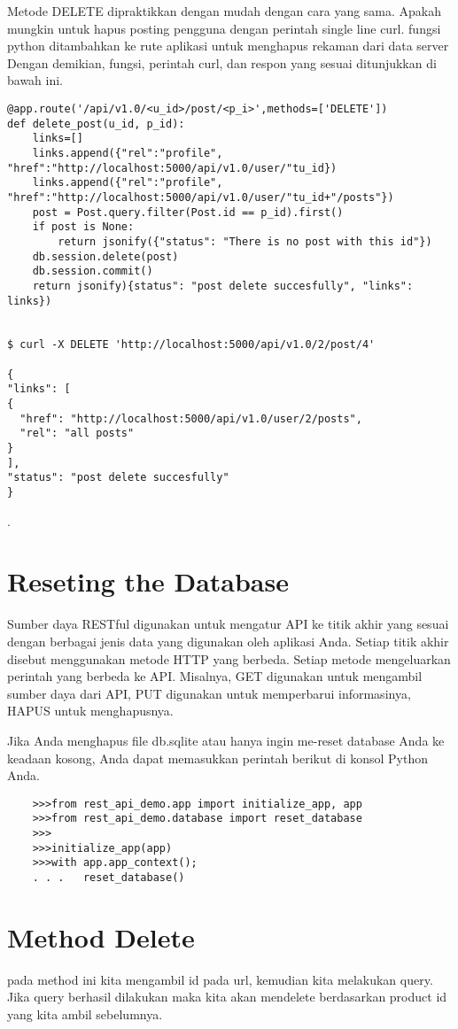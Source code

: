Metode DELETE dipraktikkan dengan mudah dengan cara yang sama. Apakah mungkin untuk hapus posting pengguna dengan perintah single line curl. 
fungsi python ditambahkan ke rute aplikasi untuk menghapus rekaman dari data server Dengan demikian, fungsi,  perintah curl, dan respon yang sesuai ditunjukkan di bawah ini.
\begin{verbatim}
@app.route('/api/v1.0/<u_id>/post/<p_i>',methods=['DELETE'])
def delete_post(u_id, p_id):
	links=[]
	links.append({"rel":"profile", "href":"http://localhost:5000/api/v1.0/user/"tu_id})
	links.append({"rel":"profile", "href":"http://localhost:5000/api/v1.0/user/"tu_id+"/posts"})
	post = Post.query.filter(Post.id == p_id).first()
	if post is None:
		return jsonify({"status": "There is no post with this id"})
	db.session.delete(post)
	db.session.commit()
	return jsonify){status": "post delete succesfully", "links": links})


$ curl -X DELETE 'http://localhost:5000/api/v1.0/2/post/4'

{
"links": [
{
  "href": "http://localhost:5000/api/v1.0/user/2/posts",
  "rel": "all posts"
}
],
"status": "post delete succesfully"
}
\end{verbatim}
\cite{alemu2014rest}.

\section{Reseting the Database}
Sumber daya RESTful digunakan untuk mengatur API ke titik akhir yang sesuai dengan berbagai jenis data yang digunakan oleh aplikasi Anda. Setiap titik akhir disebut menggunakan metode HTTP yang berbeda. Setiap metode mengeluarkan perintah yang berbeda ke API. Misalnya, GET digunakan untuk mengambil sumber daya dari API, PUT digunakan untuk memperbarui informasinya, HAPUS untuk menghapusnya.

Jika Anda menghapus file db.sqlite atau hanya ingin me-reset database Anda ke keadaan kosong, Anda dapat memasukkan perintah berikut di konsol Python Anda.
\begin{verbatim}
	>>>from rest_api_demo.app import initialize_app, app
	>>>from rest_api_demo.database import reset_database
	>>>
	>>>initialize_app(app)
	>>>with app.app_context();
	. . .	reset_database()
\end{verbatim}
\section{Method Delete}
pada method ini kita mengambil id pada url, kemudian kita melakukan query. Jika query berhasil dilakukan maka kita akan mendelete berdasarkan product id yang kita ambil sebelumnya.

